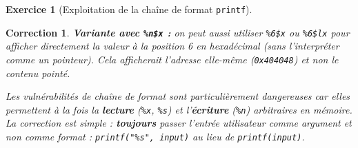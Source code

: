 \documentclass[a4paper,11pt]{article}
\theoremstyle{plain}
\newtheorem{correction}{Correction}
\theoremstyle{definition}
\newtheorem{exercice}{Exercice}
\begin{document}
\begin{exercice}[Exploitation de la chaîne de format \texttt{printf}]
\begin{correction}
\textbf{Variante avec \texttt{\%n\$x} :} on peut aussi utiliser \texttt{\%6\$x} ou \texttt{\%6\$lx} pour afficher directement la valeur à la position 6 en hexadécimal (sans l'interpréter comme un pointeur). Cela afficherait l'adresse elle-même (\texttt{0x404048}) et non le contenu pointé.

\begin{pointcle}
Les vulnérabilités de chaîne de format sont particulièrement dangereuses car elles permettent à la fois la \textbf{lecture} (\texttt{\%x}, \texttt{\%s}) et l'\textbf{écriture} (\texttt{\%n}) arbitraires en mémoire. La correction est simple : \textbf{toujours} passer l'entrée utilisateur comme argument et non comme format : \texttt{printf("\%s", input)} au lieu de \texttt{printf(input)}.
\end{pointcle}
\end{correction}

\end{exercice}
\end{document}

